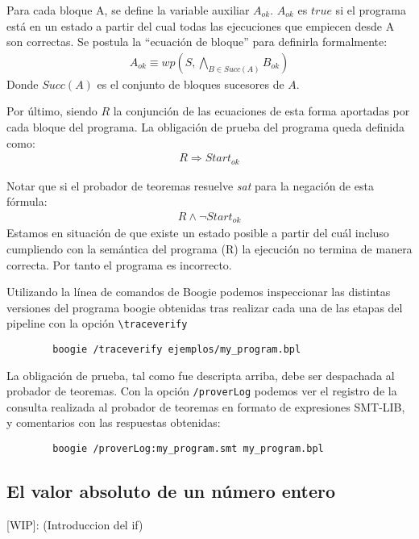 \documentclass[12pt, a4paper, openany, fleqn]{book}
\begin{document}
    Para cada bloque A, se define la variable auxiliar $A_{ok}$. $A_{ok}$ es $true$ si el programa está en un estado a partir del cual todas las ejecuciones que empiecen desde A son correctas. Se postula la ``ecuación de bloque'' para definirla formalmente:
    \begin{align*}
        A_{ok} \equiv wp(S, \bigwedge_{B \in Succ(A)} B_{ok})
    \end{align*}
    Donde $Succ(A)$ es el conjunto de bloques sucesores de $A$.

    Por último, siendo $R$ la conjunción de las ecuaciones de esta forma aportadas por cada bloque del programa.
    La obligación de prueba del programa queda definida como:
    \begin{align*}
        R \Rightarrow Start_{ok}
    \end{align*}

    Notar que si el probador de teoremas resuelve \textit{sat} para la negación de esta fórmula:
    \begin{align*}
        R \land \lnot Start_{ok}
    \end{align*}
    Estamos en situación de que existe un estado posible a partir del cuál incluso cumpliendo con la semántica del programa (R) la ejecución no termina de manera correcta. Por tanto el programa es incorrecto.

    Utilizando la línea de comandos de Boogie podemos inspeccionar las distintas versiones del programa boogie obtenidas tras realizar cada una de las etapas del pipeline con la opción \verb|\traceverify|
    \begin{verbatim}
        boogie /traceverify ejemplos/my_program.bpl
    \end{verbatim}

    La obligación de prueba, tal como fue descripta arriba, debe ser despachada al probador de teoremas.
    Con la opción \verb|/proverLog| podemos ver el registro de la consulta realizada al probador de teoremas en formato de expresiones SMT-LIB, y comentarios con las respuestas obtenidas:
    \begin{verbatim}
        boogie /proverLog:my_program.smt my_program.bpl
    \end{verbatim}


    \subsection{El valor absoluto de un número entero}
    [WIP]: (Introduccion del if)
\end{document}
